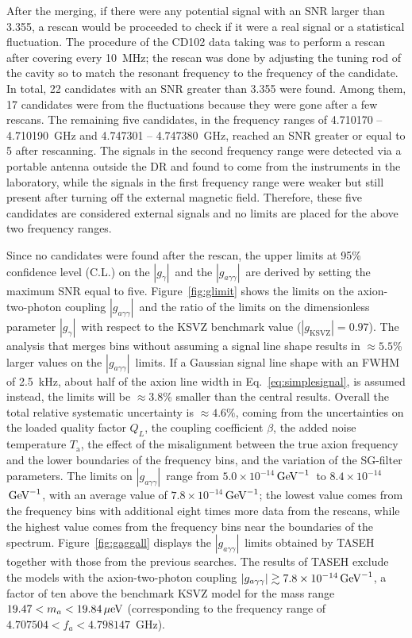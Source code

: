 \documentclass[%
 reprint,prl, %
 amsmath,amssymb,
 aps,
]{revtex4-2}
\newcommand{\gagg}{\ensuremath{\left|g_{a\gamma\gamma}\right|}}
\newcommand{\ggamma}{\ensuremath{\left|g_{\gamma}\right|}}
\newcommand{\ma}{\ensuremath{m_a}}
\newcommand{\ta}{\ensuremath{T_\text{a}}}
\newcommand{\muevcc}{\ensuremath{\,\mu\text{e\hspace{-.08em}V}}}
\newcommand{\GeVinv}{\ensuremath{\,\text{Ge\hspace{-.08em}V}^{-1}}}
\newcommand{\flo}{\ensuremath{4.707504}}
\newcommand{\fhi}{\ensuremath{4.798147}}
\newcommand{\mlo}{\ensuremath{19.47}}
\newcommand{\mhi}{\ensuremath{19.84}}
\newcommand{\avelimit}{\ensuremath{7.8\times 10^{-14}}}
\newcommand{\lolimit}{\ensuremath{5.0\times 10^{-14}}}
\newcommand{\hilimit}{\ensuremath{8.4\times 10^{-14}}}
\begin{document}
 After the merging, if there were any potential signal with an SNR larger than 
3.355, a rescan would be proceeded to check if it were a real signal 
or a statistical fluctuation. 
The procedure of the CD102 data taking was to perform a rescan after 
covering every 10~MHz; the rescan was done by adjusting the tuning rod of the 
cavity so to match the resonant frequency to the frequency of the candidate. 
In total, 22 candidates with an SNR greater than 3.355 were found. 
Among them, 17 candidates were from the fluctuations because they were gone 
after a few rescans. 
The remaining five candidates, in the frequency ranges of 
4.710170 -- 4.710190~GHz and 4.747301 -- 4.747380~GHz, reached an SNR 
greater or equal to 5 after rescanning. The signals in the second frequency 
range were detected via a portable antenna outside the DR and found 
to come from the instruments in the laboratory, while the signals 
in the first frequency range were weaker but still present after 
turning off the external magnetic field. 
Therefore, these five candidates are considered external signals and 
no limits are placed for the above two frequency ranges.  

Since no candidates were found after the rescan, the upper limits 
at 95\% confidence level (C.L.) on the \ggamma\ and the 
 \gagg\ are derived by setting the maximum SNR equal to five.  
Figure~\ref{fig:glimit} shows the limits on the axion-two-photon coupling 
\gagg\ and the ratio of the limits on the dimensionless parameter \ggamma\ 
with respect to the KSVZ benchmark value ($\left|g_\text{KSVZ}\right|=0.97$).  
The analysis that merges bins without 
assuming a signal line shape results in $\approx5.5$\% larger values on the 
\gagg\ limits. If a Gaussian signal line shape with an FWHM of 2.5~kHz,  
about half of the axion line width in Eq.~\eqref{eq:simplesignal}, is 
assumed instead, the limits will be $\approx3.8$\% smaller than the central 
results. 
Overall the total relative systematic uncertainty is 
$\approx 4.6\%$, coming from the uncertainties on the loaded quality 
factor $Q_L$, the coupling coefficient $\beta$, the added noise temperature 
\ta, the effect of the misalignment between the true axion frequency and 
the lower boundaries of the frequency bins, and the variation of the 
SG-filter parameters. 
The limits on 
\gagg\ range from \lolimit\GeVinv\ to \hilimit\GeVinv, with an average 
value of \avelimit\GeVinv; the lowest value comes from the frequency bins with 
additional eight times more data from the rescans, while the highest value 
comes from the frequency bins near the boundaries of the spectrum. 
Figure~\ref{fig:gaggall} displays the \gagg\ limits obtained by TASEH 
together with those from the previous searches. 
The results of TASEH exclude the models with the axion-two-photon
coupling $\gagg\gtrsim \avelimit\GeVinv$, a factor of ten above the benchmark
KSVZ model for the mass range $\mlo < \ma < \mhi \muevcc$ (corresponding to 
the frequency range of $\flo < f_a < \fhi$~GHz). 
\end{document}
